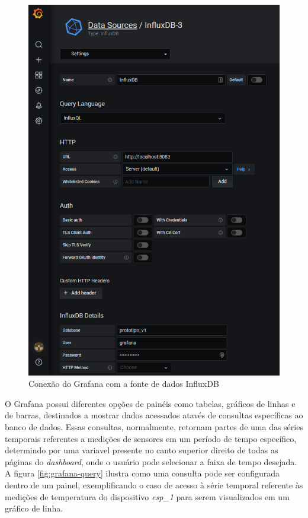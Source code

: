 \documentclass[../monografia.tex]{subfiles}
\begin{document}
\begin{figure}[h!]
	\centering
	\includegraphics[scale=0.4]{grafana-datasource.png}
	\caption{Conexão do Grafana com a fonte de dados InfluxDB}
	\label{fig:grafana-datasource}
\end{figure}

O Grafana possui diferentes opções de painéis como tabelas, gráficos de linhas e de barras, destinados a mostrar dados acessados atavés de consultas específicas ao banco de dados. Essas consultas, normalmente, retornam partes de uma das séries temporais referentes a medições de sensores em um período de tempo específico, determindo por uma variavel presente no canto superior direito de todas as páginas do \textit{dashboard}, onde o usuário pode selecionar a faixa de tempo desejada. A figura \ref{fig:grafana-query} ilustra como uma consulta pode ser configurada dentro de um painel, exemplificando o caso de acesso à série temporal referente às medições de temperatura do dispositivo \textit{esp\_1} para serem visualizados em um gráfico de linha.
\end{document}
